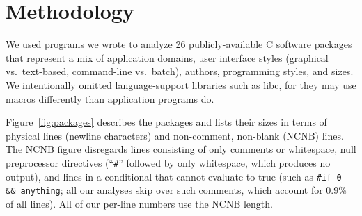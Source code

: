 \documentclass[10pt]{article}
\def\numpackages{26}
\newcommand{\pkg}[1]{\textsf{#1}}
\begin{document}
%

%






\section{Methodology}
\label{sec:methodology}


We used programs we wrote to analyze {\numpackages} publicly-available C
software packages that
represent a mix of application domains, user interface styles (graphical vs.\ 
text-based, command-line vs.\ batch), authors, programming styles, and
sizes.  We intentionally omitted language-support libraries such as \pkg{libc}, for they
may use macros differently than application programs do.

Figure~\ref{fig:packages} describes the packages and lists their sizes in
terms of physical lines (newline characters) and non-comment, non-blank
(NCNB) lines.  The NCNB figure disregards lines consisting of only comments
or whitespace, null preprocessor directives (``{\tt \#}'' followed by only
whitespace, which produces no output), and lines in a conditional that
cannot evaluate to true (such as {\tt \#if 0 \&\& anything}; all our
analyses skip over such comments, which account for 0.9\% of all lines).
All of our per-line numbers use the NCNB length.
\end{document}
